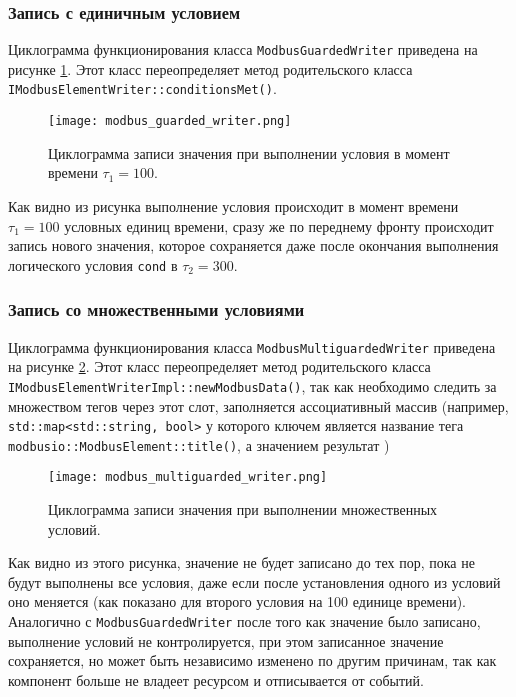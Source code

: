 \subsubsection{Запись с единичным условием}\label{sec:guard}
Циклограмма функционирования класса \texttt{ModbusGuardedWriter} приведена на рисунке \ref{fig:modbus_guarded_writed}.
Этот класс переопределяет метод родительского класса \texttt{IModbusElementWriter::conditionsMet()}.
\begin{center}
    \begin{figure}[h!]
        \texttt{[image: modbus\_guarded\_writer.png]}
        \caption{Циклограмма записи значения при выполнении условия в момент времени $\tau_1=100$.}\label{fig:modbus_guarded_writed}
    \end{figure}
\end{center}
Как видно из рисунка выполнение условия происходит в момент времени $\tau_1=100$ условных единиц времени,
сразу же по переднему фронту происходит запись нового значения, которое сохраняется даже после окончания
выполнения логического условия \texttt{cond} в $\tau_2=300$.


\subsubsection{Запись со множественными условиями}
Циклограмма функционирования класса \texttt{ModbusMultiguardedWriter} приведена на рисунке \ref{fig:modbus_multiguarded_writed}.
Этот класс переопределяет метод родительского класса \texttt{IModbusElementWriterImpl::newModbusData()},
так как необходимо следить за множеством тегов через этот слот,
заполняется ассоциативный массив (например, \texttt{std::map<std::string, bool>} у которого ключем является
название тега \texttt{modbusio::ModbusElement::title()}, а значением результат )
\begin{center}
    \begin{figure}[h!]
        \texttt{[image: modbus\_multiguarded\_writer.png]}
        \caption{Циклограмма записи значения при выполнении множественных условий.}\label{fig:modbus_multiguarded_writed}
    \end{figure}
\end{center}
Как видно из этого рисунка, значение не будет записано до тех пор, пока не будут
выполнены все условия, даже если после установления одного из условий оно меняется
(как показано для второго условия на 100 единице времени). Аналогично с \texttt{ModbusGuardedWriter}
после того как значение было записано, выполнение условий не контролируется, 
при этом записанное значение сохраняется, но может быть независимо изменено по другим причинам,
так как компонент больше не владеет ресурсом и отписывается от событий.



